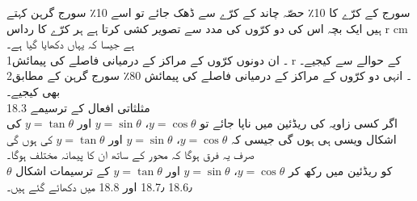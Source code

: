 سورج کے کرّے کا 10٪ حصّہ چاند کے کرّے سے ڈھک جائے تو اسے 10٪ سورج گرہن کہتے ہیں 
ایک بچہ اس کی دو کرّوں کی مدد سے تصویر کشی کرتا ہے ہر کرّے کا رداس r cm ہے جیسا کہ یہاں دکھایا گیا ہے۔\\
1۔ ان دونوں کرّوں کے مراکز کے درمیانی فاصلے کی پیمائش r کے حوالے سے کیجیے۔\\
2۔ انہی دو کرّوں کے مراکز کے درمیانی فاصلے کی پیمائش 80٪ سورج گرہن کے مطابق بھی کیجیے۔\\
18.3 مثلثاتی افعال کے ترسیمے\\
اگر کسی زاویہ کی ریڈئین میں ناپا جائے تو 
\(y=\cos\theta\)،
\(y=\sin\theta\)
اور
\(y=\tan\theta\)
کی اشکال ویسی ہی ہوں گی جیسی کہ 
\(y=\cos\theta\)،
\(y=\sin\theta\)
اور
\(y=\tan\theta\)
کی ہوں گی صرف یہ فرق ہوگا کہ محور کے ساتھ ان کا پیمانہ مختلف ہوگا۔\\
\(\theta\)
کو ریڈئین میں رکھ کر 
\(y=\cos\theta\)،
\(y=\sin\theta\)
اور
\(y=\tan\theta\)
کے ترسیمات اشکال 18.6٫ 18.7٫ اور 18.8 میں دکھائے گئے ہیں۔\\


